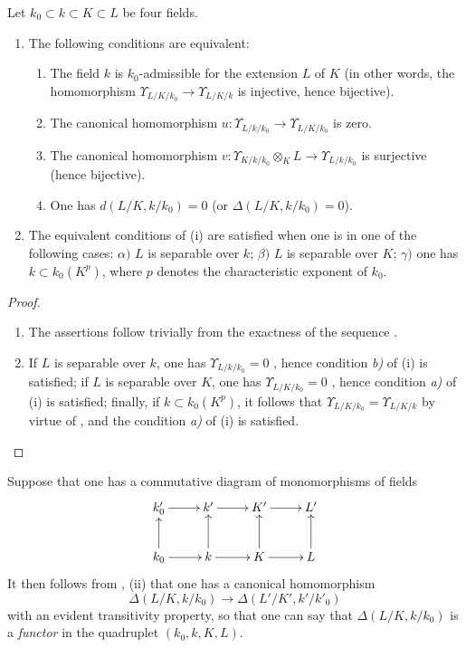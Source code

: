 \begin{proposition}[21.6.2]
\label{0.21.6.2}
Let $k_0\subset k\subset K\subset L$ be four fields.
\begin{enumerate}
  \item[\rm (i)] The following conditions are equivalent:
  \begin{enumerate}
    \item[\rm a)] The field $k$ is $k_0$-admissible for the extension $L$ of $K$ \textup{(}in other words, the homomorphism $\Upsilon_{L/K/k_0}\to\Upsilon_{L/K/k}$ is injective, hence bijective\textup{)}.
    \item[\rm b)] The canonical homomorphism $u:\Upsilon_{L/k/k_0}\to\Upsilon_{L/K/k_0}$ is zero.
    \item[\rm c)] The canonical homomorphism $v:\Upsilon_{K/k/k_0}\otimes_K L\to\Upsilon_{L/k/k_0}$ is surjective \textup{(}hence bijective\textup{)}.
    \item[\rm d)] One has $d(L/K,k/k_0)=0$ \textup{(}or $\Delta(L/K,k/k_0)=0$\textup{)}.
  \end{enumerate}
  \item[\rm (ii)] The equivalent conditions of \textnormal{(i)} are satisfied when one is in one of the following cases: $\alpha)$ $L$ is separable over $k$; $\beta)$ $L$ is separable over $K$; $\gamma)$ one has $k\subset k_0(K^p)$, where $p$ denotes the characteristic exponent of $k_0$.
\end{enumerate}
\end{proposition}

\begin{proof}
\begin{enumerate}
  \item[(i)] The assertions follow trivially from the exactness of the sequence .
  \item[(ii)] If $L$ is separable over $k$, one has $\Upsilon_{L/k/k_0}=0$ , hence condition \emph{b)} of (i) is satisfied; if $L$ is separable over $K$, one has $\Upsilon_{L/K/k_0}=0$ , hence condition \emph{a)} of (i) is satisfied; finally, if $k\subset k_0(K^p)$, it follows that $\Upsilon_{L/K/k_0}=\Upsilon_{L/K/k}$ by virtue of , and the condition \emph{a)} of (i) is satisfied.
\end{enumerate}
\end{proof}

\begin{env}[21.6.3]
\label{0.21.6.3}
Suppose that one has a commutative diagram of monomorphisms of fields
\[
  \xymatrix{
    k'_0\ar[r] & k'\ar[r] & K'\ar[r] & L'\\
    k_0\ar[u]\ar[r] & k\ar[u]\ar[r] & K\ar[u]\ar[r] & L\ar[u]
  }
\]
It then follows from , (ii) that one has a canonical homomorphism
\begin{equation}
\tag{21.6.3.1}
  \label{0.21.6.3.1}
  \Delta(L/K,k/k_0)\to\Delta(L'/K',k'/k'_0)
\end{equation}
with an evident transitivity property, so that one can say that $\Delta(L/K,k/k_0)$ is a \emph{functor} in the quadruplet $(k_0,k,K,L)$.
\end{env}

